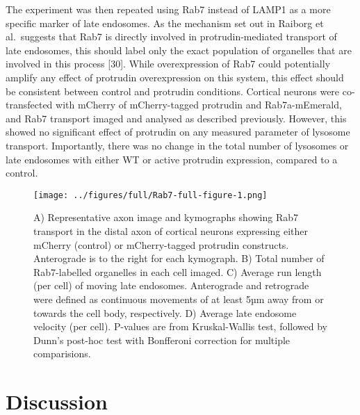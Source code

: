 \documentclass[
  12pt,
  a4paper,
]{book}
\begin{document}
The experiment was then repeated using Rab7 instead of LAMP1 as a more specific marker of late endosomes. As the mechanism set out in Raiborg et al.~suggests that Rab7 is directly involved in protrudin-mediated transport of late endosomes, this should label only the exact population of organelles that are involved in this process {[}30{]}. While overexpression of Rab7 could potentially amplify any effect of protrudin overexpression on this system, this effect should be consistent between control and protrudin conditions. Cortical neurons were co-transfected with mCherry of mCherry-tagged protrudin and Rab7a-mEmerald, and Rab7 transport imaged and analysed as described previously. However, this showed no significant effect of protrudin on any measured parameter of lysosome transport. Importantly, there was no change in the total number of lysosomes or late endosomes with either WT or active protrudin expression, compared to a control.

\begin{figure}
\centering
\texttt{[image: ../figures/full/Rab7-full-figure-1.png]}
\caption{\label{fig:Rab7-full-figure}A) Representative axon image and kymographs showing Rab7 transport in the distal axon of cortical neurons expressing either mCherry (control) or mCherry-tagged protrudin constructs. Anterograde is to the right for each kymograph. B) Total number of Rab7-labelled organelles in each cell imaged. C) Average run length (per cell) of moving late endosomes. Anterograde and retrograde were defined as continuous movements of at least 5µm away from or towards the cell body, respectively. D) Average late endosome velocity (per cell). P-values are from Kruskal-Wallis test, followed by Dunn's post-hoc test with Bonfferoni correction for multiple comparisions.}
\end{figure}

\hypertarget{no-FYCO}{%
\section{Discussion}\label{no-FYCO}}
\end{document}
